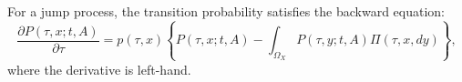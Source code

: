 For a jump process, the transition probability satisfies the backward equation:
$$\frac{\partial P(\tau, x; t, A)}{\partial \tau} = p(\tau, x) \left\{ P(\tau, x; t, A) - \int_{\Omega_X} P(\tau, y; t, A) \Pi(\tau, x, dy) \right\},$$
where the derivative is left-hand.
